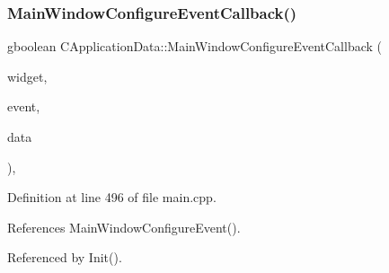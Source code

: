 \subsubsection{\texorpdfstring{Main\+Window\+Configure\+Event\+Callback()}{MainWindowConfigureEventCallback()}}
{\footnotesize\ttfamily gboolean C\+Application\+Data\+::\+Main\+Window\+Configure\+Event\+Callback (\begin{DoxyParamCaption}\item[{Gtk\+Widget $\ast$}]{widget,  }\item[{Gdk\+Event $\ast$}]{event,  }\item[{gpointer}]{data }\end{DoxyParamCaption})\hspace{0.3cm}{\ttfamily [static]}, {\ttfamily [protected]}}



Definition at line 496 of file main.\+cpp.



References Main\+Window\+Configure\+Event().



Referenced by Init().


